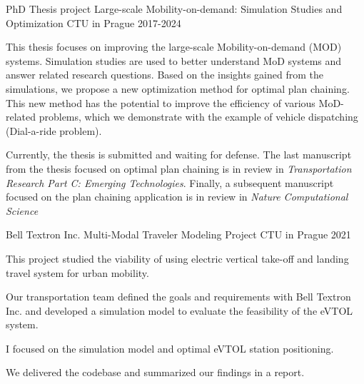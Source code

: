 

\begin{cventries}

  \cventry
    {PhD Thesis project} %
    {Large-scale Mobility-on-demand: Simulation Studies and Optimization} %
    {CTU in Prague} %
    {2017-2024} %
    {
      \begin{cvitems} %
        \item {This thesis focuses on improving the large-scale Mobility-on-demand (MOD) systems.  
        Simulation studies are used to better understand MoD systems and answer related research questions. 
        Based on the insights gained from the simulations, we propose a new optimization method for optimal plan chaining.
        This new method has the potential to improve the efficiency of various MoD-related problems, which we demonstrate with the example of vehicle dispatching (Dial-a-ride problem).
        }
        \item {Currently, the thesis is submitted and waiting for defense. The last manuscript from the thesis focused on optimal plan chaining is in review in \emph{Transportation Research Part C: Emerging Technologies}.
        Finally, a subsequent manuscript focused on the plan chaining application is in review in \emph{Nature Computational Science}
        }
      \end{cvitems}
    }

    

  \cventry
    {Bell Textron Inc. Multi-Modal Traveler Modeling Project} %
    {
    } %
    {CTU in Prague} %
    {2021} %
    {
      \begin{cvitems} %
        \item {This project studied the viability of using electric vertical take-off and landing travel system for urban mobility.}
        \item {Our transportation team defined the goals and requirements with Bell Textron Inc. and developed a simulation model to evaluate the feasibility of the eVTOL system.}
        \item I focused on the simulation model and optimal eVTOL station positioning.
        \item {We delivered the codebase and summarized our findings in a report.}
      \end{cvitems}
    }
\end{cventries}


